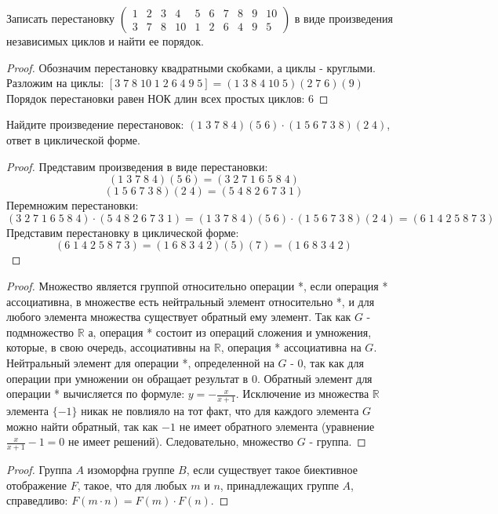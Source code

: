 \begin{problem}
	Записать перестановку
	$\begin{pmatrix}
	1 & 2 & 3 & 4 & 5 & 6 & 7 & 8 & 9 & 10\\
	3 & 7 & 8 & 10 & 1 & 2 & 6 & 4 & 9 & 5
	\end{pmatrix}$ в виде произведения независимых циклов и найти ее порядок.
\end{problem}

\begin{proof}
	Обозначим перестановку квадратными скобками, а циклы - круглыми.
	Разложим на циклы: $[3\;7\;8\;10\;1\;2\;6\;4\;9\;5]=(1\;3\;8\;4\;10\;5)(2\;7\;6)(9)$
	\newline
	Порядок перестановки равен НОК длин всех простых циклов: $6$
\end{proof}

\begin{problem}
	Найдите произведение перестановок: $(1\;3\;7\;8\;4)(5\;6)\cdot(1\;5\;6\;7\;3\;8)(2\;4)$, ответ в циклической форме.
\end{problem}

\begin{proof}
	Представим произведения в виде перестановки:
	\[
		(1\;3\;7\;8\;4)(5\;6) = (3\;2\;7\;1\;6\;5\;8\;4)
	\]
	\[
		(1\;5\;6\;7\;3\;8)(2\;4) = (5\;4\;8\;2\;6\;7\;3\;1)
	\]
	Перемножим перестановки:
	\[
		(3\;2\;7\;1\;6\;5\;8\;4)\cdot(5\;4\;8\;2\;6\;7\;3\;1) = (1\;3\;7\;8\;4)(5\;6)\cdot(1\;5\;6\;7\;3\;8)(2\;4) = (6\;1\;4\;2\;5\;8\;7\;3)
	\]
	Представим перестановку в циклической форме:
	\[
		(6\;1\;4\;2\;5\;8\;7\;3) = (1\;6\;8\;3\;4\;2)(5)(7) = (1\;6\;8\;3\;4\;2)
	\]
\end{proof}

\begin{problem}

\end{problem}

\begin{proof}
	Множество является группой относительно операции *, если операция * ассоциативна, в множестве есть нейтральный элемент относительно *, и для любого элемента множества существует обратный ему элемент.
	\newline
	Так как $G$ - подмножество $\mathbb {R}$ а, операция * состоит из операций сложения и умножения, которые, в свою очередь, ассоциативны на $\mathbb {R}$, операция * ассоциативна на $G$.
	\newline
	Нейтральный элемент для операции *, определенной на $G$ - $0$, так как для операции при умножении он обращает результат в $0$.
	\newline
	Обратный элемент для операции * вычисляется по формуле: $y=-\frac{x}{x+1}$. Исключение из множества $\mathbb {R}$ элемента $\{-1\}$ никак не повлияло на тот факт, что для каждого элемента $G$ можно найти обратный, так как $-1$ не имеет обратного элемента (уравнение $\frac{x}{x+1}-1=0$ не имеет решений).
	\newline
	Следовательно, множество $G$ - группа.
\end{proof}

\begin{problem}
	
\end{problem}

\begin{proof}
	Группа $A$ изоморфна группе $B$, если существует такое биективное отображение $F$, такое, что для любых $m$ и $n$, принадлежащих группе $A$, справедливо: $F(m\cdot n) = F(m)\cdot F(n)$.
\end{proof}